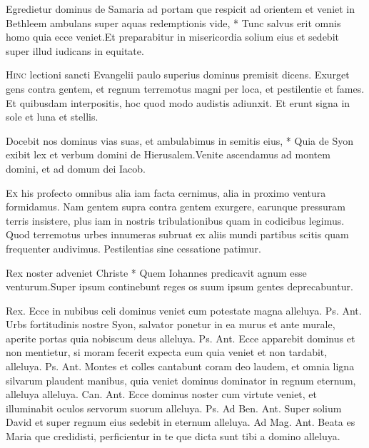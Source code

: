 \begin{multicols*}{2}
\begin{responsory}
{Egredietur dominus de Samaria ad portam que respicit ad orientem et veniet in Bethleem ambulans super aquas redemptionis vide, * Tunc salvus erit omnis homo quia ecce veniet.}{Et preparabitur in misericordia solium eius et sedebit super illud iudicans in equitate.}
\end{responsory}
\lettrine[lines=2]{\zallmancaps \color{Red} H}{inc} lectioni sancti Evangelii paulo superius dominus premisit dicens. Exurget gens contra gentem, et regnum terremotus magni per loca, et pestilentie et fames. Et quibusdam interpositis, hoc quod modo audistis adiunxit. Et erunt signa in sole et luna et stellis.
\begin{responsory}
{Docebit nos dominus vias suas, et ambulabimus in semitis eius, * Quia de Syon exibit lex et verbum domini de Hierusalem.}{Venite ascendamus ad montem domini, et ad domum dei Iacob.}
\end{responsory}
\lettrine[lines=2]{\zallmancaps \color{Blue} E}{x} his profecto omnibus alia iam facta cernimus, alia in proximo ventura formidamus. Nam gentem supra contra gentem exurgere, earunque pressuram terris insistere, plus iam in nostris tribulationibus quam in codicibus legimus. Quod terremotus urbes innumeras subruat ex aliis mundi partibus scitis quam frequenter audivimus. Pestilentias sine cessatione patimur.
\begin{responsory-doxology}
{Rex noster adveniet Christe * Quem Iohannes predicavit agnum esse venturum.}{Super ipsum continebunt reges os suum ipsum gentes deprecabuntur.}
\end{responsory-doxology}
Rex.
 Ecce in nubibus celi dominus veniet cum potestate magna alleluya. {\color{Red} Ps.}  {\color{Red} Ant.} Urbs fortitudinis nostre Syon, salvator ponetur in ea murus et ante murale, aperite portas quia nobiscum deus alleluya. {\color{Red} Ps.}  {\color{Red} Ant.} Ecce apparebit dominus et non mentietur, si moram fecerit expecta eum quia veniet et non tardabit, alleluya. {\color{Red} Ps.}  {\color{Red} Ant.} Montes et colles cantabunt coram deo laudem, et omnia ligna silvarum plaudent manibus, quia veniet dominus dominator in regnum eternum, alleluya alleluya. {\color{Red} Can.}  {\color{Red} Ant.} Ecce dominus noster cum virtute veniet, et illuminabit oculos servorum suorum alleluya. {\color{Red} Ps.}  {\color{Red} Ad Ben. Ant.} Super solium David et super regnum eius sedebit in eternum alleluya. {\color{Red} Ad Mag. Ant.} Beata es Maria que credidisti, perficientur in te que dicta sunt tibi a domino alleluya.

\end{multicols*}

